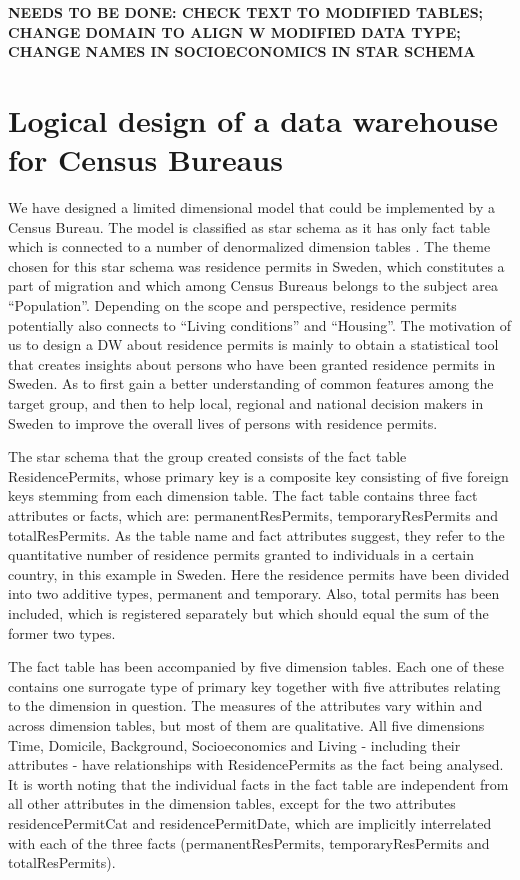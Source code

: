 
\textbf{NEEDS TO BE DONE: CHECK TEXT TO MODIFIED TABLES; CHANGE DOMAIN TO ALIGN W MODIFIED DATA TYPE; CHANGE NAMES IN SOCIOECONOMICS IN STAR SCHEMA}
\section{Logical design of a data warehouse for Census Bureaus}
We have designed a limited dimensional model that could be implemented by a Census Bureau. 
The model is classified as star schema as it has only fact table which is connected to a number 
of denormalized dimension tables \cite[chapter~32.4]{CourseLitt}. The theme chosen for this star schema was 
residence permits in Sweden, which constitutes a part of migration and which among Census Bureaus 
belongs to the subject area “Population”. Depending on the scope and perspective, residence permits 
potentially also connects to “Living conditions” and “Housing”. The motivation of us to design a DW 
about residence permits is mainly to obtain a statistical tool that creates insights about persons 
who have been granted residence permits in Sweden. As to first gain a better understanding of common 
features among the target group, and then to help local, regional and national decision makers in 
Sweden to improve the overall lives of persons with residence permits. 

The star schema that the group created consists of the fact table ResidencePermits, whose primary 
key is a composite key consisting of five foreign keys stemming from each dimension table. The fact 
table contains three fact attributes or facts, which are: permanentResPermits, temporaryResPermits and 
totalResPermits. As the table name and fact attributes suggest, they refer to the quantitative number 
of residence permits granted to individuals in a certain country, in this example in Sweden. Here the 
residence permits have been divided into two additive types, permanent and temporary. Also, total 
permits has been included, which is registered separately but which should equal the sum of the former two types. 

The fact table has been accompanied by five dimension tables. Each one of these contains one surrogate 
type of primary key together with five attributes relating to the dimension in question. The measures 
of the attributes vary within and across dimension tables, but most of them are qualitative. All five 
dimensions Time, Domicile, Background, Socioeconomics and Living - including their attributes - have 
relationships with ResidencePermits as the fact being analysed. It is worth noting that the individual 
facts in the fact table are independent from all other attributes in the dimension tables, except for the 
two attributes residencePermitCat and residencePermitDate, which are implicitly interrelated with each of 
the three facts (permanentResPermits, temporaryResPermits and totalResPermits). 
\newpage
